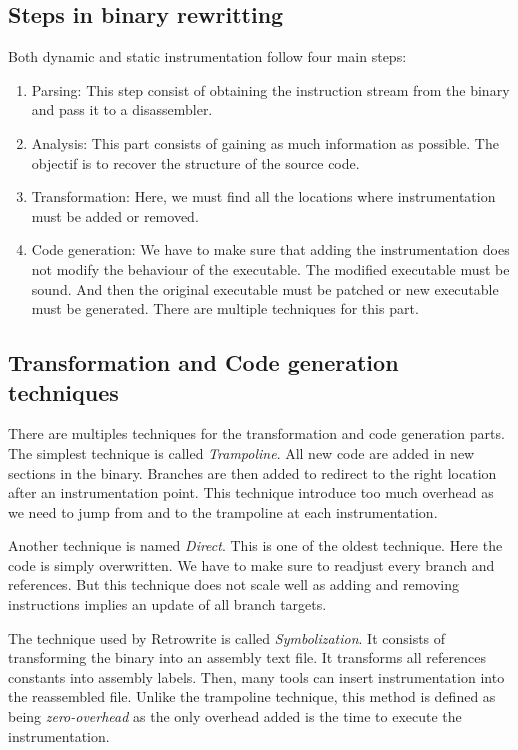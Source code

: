 \documentclass[a4paper,11pt,oneside]{report}
\newcommand{\sysname}{Retrowrite\xspace}
\begin{document}
\subsection{Steps in binary rewritting}
Both dynamic and static instrumentation follow four main steps:
\begin{enumerate}
    \item Parsing:
        This step consist of obtaining the instruction stream from the binary
        and pass it to a disassembler.
    \item Analysis:
        This part consists of gaining as much information as possible. The
        objectif is to recover the structure of the source code.
    \item Transformation:
        Here, we must find all the locations where instrumentation must be
        added or removed. 
    \item Code generation:
        We have to make sure that adding the instrumentation does not modify the
        behaviour of the executable. The modified executable must be sound. And
        then the original executable must be patched or new executable must be
        generated.
        There are multiple techniques for this part. 
\end{enumerate}



\subsection{Transformation and Code generation techniques}
There are multiples techniques for the transformation and code generation
parts. The simplest technique is called \textit{Trampoline}. All new code are
added in new sections in the binary. Branches are then added to redirect to the
right location after an instrumentation point. This technique introduce too much overhead as we
need to jump from and to the trampoline at each instrumentation. 


Another technique is named \textit{Direct}. This is one of the oldest
technique. Here the code is simply overwritten. We have to make sure to readjust
every branch and references.  But this technique does not scale well as adding
and removing instructions implies an update of all branch targets.


The technique used by \sysname is called \textit{Symbolization}. It
consists of transforming the binary into an assembly text file. It transforms
all references constants into assembly labels. Then, many tools can insert
instrumentation into the reassembled file. Unlike the trampoline technique,
this method is defined as being \textit{zero-overhead} as the only overhead
added is the time to execute the instrumentation.
\end{document}
